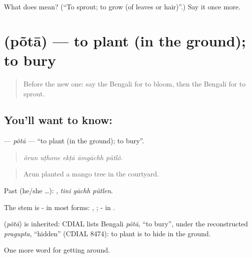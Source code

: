 \begin{tcolorbox}[breakable,colback=teal!4,colframe=teal!35!black,title={Before you move on}]
What does  mean? (\textquotedblleft{}To sprout; to grow (of leaves or hair)\textquotedblright{}.) Say it once more.
\end{tcolorbox}
\section[\texorpdfstring{\bn{পোঁতা} (põtā)}{পোঁতা (põtā)}]{ (põtā) — to plant (in the ground); to bury}

\label{lesson:BN-C436-pota}



\begin{quote}
Before the new one: say the Bengali for to bloom, then the Bengali for to sprout.
\end{quote}

\subsection*{You'll want to know: }
\textbf{} — \emph{põtā} — \textquotedblleft{}to plant (in the ground); to bury\textquotedblright{}.

\begin{quote}
    
\end{quote}

\begin{quote}
\emph{ôrun uṭhone ekṭā āmgāchh pũtlô.}
\end{quote}

\begin{quote}
Arun planted a mango tree in the courtyard.
\end{quote}

Past (he/she …):   , \emph{tini gāchh pũtlen}.

The stem is - in most forms: , ; - in  .

\begin{cousinweb}
\textbf{} (\emph{põtā}) is inherited: CDIAL lists Bengali \emph{põtā}, \textquotedblleft{}to bury\textquotedblright{}, under the reconstructed \emph{pragupta}, \textquotedblleft{}hidden\textquotedblright{} (CDIAL 8474): to plant is to hide in the ground.
\end{cousinweb}

\begin{grammarlens}[title={What you've built}]
One more word for getting around.
\end{grammarlens}

